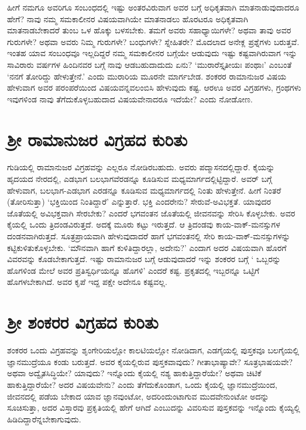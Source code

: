 ಹೀಗೆ ನಮಗೂ ಅವರಿಗೂ ಸಂಬಂಧದಲ್ಲಿ ಇಷ್ಟು ಅಂತರವಿರುವಾಗ ಅವರ ಬಗ್ಗೆ ಅಧಿಕೃತವಾಗಿ ಮಾತನಾಡುವುದಾದರೂ ಹೇಗೆ? ನಾವು ನಮ್ಮ ಸಮಕಾಲೀನರ ವಿಷಯವಾಗಿಯೇ ಮಾತನಾಡಲು ಹೊರಟರೂ ಅಧಿಕೃತವಾಗಿ ಮಾತನಾಡಬೇಕಾದರೆ ತುಂಬ ಒಳ ಹೊಕ್ಕು ಬಳಸಬೇಕು. ತಮಗೆ ಅವರು ಸಹಾಧ್ಯಾಯಿಗಳೇ? ಅಥವಾ ತಾವು ಅವರ ಗುರುಗಳೇ? ಅಥವಾ ಅವರು ನಿಮ್ಮ ಗುರುಗಳೇ? ಬಂಧುಗಳೇ? ಸ್ನೇಹಿತರೇ? ಮೊದಲಾದ ಅನೇಕ್ಲ ಪ್ರಶ್ನೆಗಳು ಬರುತ್ತವೆ. ಇಂತಹ ಯಾವ ಸಂಬಂಧವೂ ಇಲ್ಲದಿದ್ದರೆ ನಮ್ಮ ಸಮಕಾಲೀನರ ಬಗ್ಗೆಯೇ ಆಡುವುದು ಇಷ್ಟು  ಕಷ್ಟವಾಗಿರುವಾಗ ಇನ್ನು ಸಾವಿರಾರು ವರ್ಷಗಳ ಹಿಂದಿನವರ ಬಗ್ಗೆ ನಾವು ಆಡಬಹುದಾದುದು ಏನು? `ಮುರಾರೆಸ್ತೃತೀಯಃ ಪಂಥಾಃ' ಎಂಬಂತೆ `ನನಗೆ ತೋರಿದ್ದು ಹೇಳುತ್ತೇನೆ.' ಎಂದು ಮುರಾರಿಯ ಮೂರನೇ ಮಾರ್ಗಬೇಡ. ಶಂಕರರ ರಾಮಾನುಜರ ವಿಷಯ ಹೇಳುವಾಗ ಅವರ ಪರಂಪರೆಯಿಂದ ವಿಷಯವನ್ನವಲಂಬಿಸಿ ಹೇಳುವುದು ಕಷ್ಟ. ಆರಊ ಅವರ ವಿಗ್ರಹಗಳು, ಗ್ರಂಥಗಳು ಇವುಗಳಿಂಡ ನಾವು ತೆಗೆದುಕೊಳ್ಳಬಹುದಾದ ವಿಷಯವೇನಾದರೂ ಇದೆಯೇ? ಎಂದು ನೋಡೋಣ.

\section*{ಶ್ರೀ ರಾಮಾನುಜರ ವಿಗ್ರಹದ ಕುರಿತು}

ಗುಡಿಯಲ್ಲಿ ರಾಮಾನುಜರ ವಿಗ್ರಹವನ್ನು ಎಲ್ಲರೂ ನೋಡಿರಬಹುದು. ಅವರು ಪದ್ಮಾಸನದಲ್ಲಿದ್ದಾರೆ. ಕೈಯನ್ನು ಹೃದಯದ ನೇರದಲ್ಲಿ, ಎಡಭಾಗ ಬಲಭಾಗವೆರಡನ್ನೂ ಕೂಡಿಸುವ ಮಧ್ಯಮಾರ್ಗದಲ್ಲಿಟ್ಟಿದ್ದಾರೆ. ಅವರ್ ಬಗ್ಗೆ ಹೇಳುವಾಗ, ಬಲಭಾಗ-ಎಡಭಾಗ ಎರಡನ್ನೂ ಕೂಡಿಸುವ ಮಧ್ಯಮಾರ್ಗದಲ್ಲಿ ನಿಂತು ಹೇಳುತ್ತೇನೆ. ಹೀಗೆ ನಿಂತರೆ (ತೋರಿಸುತ್ತಾ) `ಭಕ್ತಿಯಿಂದ ನಿಂತಿದ್ದಾರೆ' ಎನ್ನುತ್ತಾರೆ. ಭಕ್ತಿ ಎಂದರೇನು? ಸೇರುವೆ-ಅವಿಭಕ್ತತೆ. ಯಾವುದರ ಜೊತೆಯಲ್ಲಿ ಅವಿಭಕ್ತವಾಗಿ ಸೇರಬೇಕು? ಎಂದರೆ ಭಗವಂತನ ಜೊತೆಯಲ್ಲಿ ಜೀವನವನ್ನು ಸೇರಿಸಿ ಕೊಳ್ಳಬೇಕು. ಅವರ ಕೈಯಲ್ಲಿ ಒಂದು ತ್ರಿದಂಡವಿರುತ್ತದೆ. ಅದಕ್ಕೆ ಮೂರು ಕಟ್ಟು ಇರುತ್ತದೆ. ಆ ತ್ರಿದಂಡವು ಕಾಯ-ವಾಕ್-ಮನಸ್ಸುಗಳ ದಂಡನವಾಗಿರುತ್ತದೆ. ಸೂತ್ರಪ್ರಾಯವಾಗಿ ಹೇಳುವುದಾದರೆ ಹಾಗೆ ಭಗವಂತನಲ್ಲಿ ಸೇರಿ ಕಾಯ-ವಾಕ್-ಮನಸ್ಸುಗಳನ್ನು ಕಟ್ಟಿಕುಳಿತುಕೊಳ್ಳಬೇಕು. `ಮೌನವಾಗಿ ಹಾಗೆ ಕುಳಿತಿದ್ದಾರಲ್ಲಾ, ಅದೇನು?' ಎಂದಾಗ ಅದರ ವಿಷಯವಾಗಿ ಹೊರಗೆ ವಿವರವನ್ನು ಕೊಡಬೇಕಾಗುತ್ತದೆ. ಇಷ್ಟು ರಾಮಾನುಜರ ಬಗ್ಗೆ ಆಡುವುದಾದರೆ ಇನ್ನು ಶಂಕರರ ಬಗ್ಗೆ ` ಒಬ್ಬರನ್ನು ಹೊಗಳಿಂಡ ಮೇಲೆ ಅವರ ಪ್ರತಿಸ್ವರ್ಧಿಯನ್ನೂ ಹೊಗಳಿ' ಎಂದರೆ ಕಷ್ಟ. ಪ್ರಕೃತದಲ್ಲಿ ಇಬ್ಬರನ್ನೂ ಒಟ್ಟಿಗೆ ಹೊಗಳಬೇಕಾಗಿದೆ. ಅವರ ಕೃಪೆ ಇದ್ದ ಪಕ್ಷೇ ಅದೇನೂ ಕಷ್ಟವಲ್ಲ.

\section*{ಶ್ರೀ ಶಂಕರರ ವಿಗ್ರಹದ ಕುರಿತು}

ಶಂಕರರ ಒಂದು ವಿಗ್ರಹವನ್ನು ಶೃಂಗೇರಿಯಲ್ಲೋ ಕಾಲಟಿಯಲ್ಲೋ ನೋಡಿದಾಗ, ಎಡಗೈಯಲ್ಲಿ ಪುಸ್ತಕವೂ ಬಲಗೈಯಲ್ಲಿ ಜ್ಞಾನಮುದ್ರೆಯೂ ಕಂಡು ಬರುತ್ತದೆ. ಅವರ ಕೈಯಲ್ಲಿರುವ ಪುಸ್ತಕವಾವುದು? ಗೀತಾಭಾಷ್ಯಾವೇ? ಸೂತ್ರಭಾಷಯವೇ? ಅಥವಾ ಅದ್ವೈತಸಿದ್ಧಿಯೇ? ಯಾವುದು? ಇನ್ನೊಂದು ಕೈಯಲ್ಲಿ ನಶ್ಯ ಹಾಕುತ್ತಿದ್ದಾರೆಯೇ? ಅಥವಾ ಚಿಟಿಕೆ ಹಾಕುತ್ತಿದ್ದಾರೆಯೇ? ಅದರ ವಿಷಯವೇನು? ಎಂದು ತೆಗೆದುಕೊಂಡಾಗ, ಒಂದು ಕೈಯಲ್ಲಿ  ಜ್ಞಾನಮುದ್ರೆಯಿಂದ, ಜೀವನದಲ್ಲಿ ಪಡೆಯ ಬೇಕಾದ ಯಾವ ಜ್ಞಾನವುಂಟೋ, ಅದರಿಂದುಂಟಾಗುವ ಮುದವೇನುಂಟೋ ಅದನ್ನು ಸೂಚಿಸುತ್ತಾ, ಅದರ ವಿಸ್ತಾರವು ಪ್ರಕೃತಿಯಲ್ಲಿ ಹೇಗೆ ಆಗಿದೆ ಎಂಬುದನ್ನು ವಿವರಿಸುವ ಪುಸ್ತಕವನ್ನು  ಇನ್ನೊಂದು ಕೈಯ್ಯಲ್ಲಿ ಹಿಡಿದಿದ್ದಾರೆನ್ನಬೇಕಾಗುವುದು.

